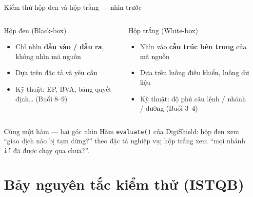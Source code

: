 \documentclass[aspectratio=169,12pt]{beamer}
\begin{document}
\begin{frame}{Kiểm thử hộp đen và hộp trắng --- nhìn trước}
  \begin{columns}
    \begin{block}{Hộp đen (Black-box)}
      \begin{itemize}
        \item Chỉ nhìn \textbf{đầu vào / đầu ra}, không nhìn mã nguồn
        \item Dựa trên đặc tả và yêu cầu
        \item Kỹ thuật: EP, BVA, bảng quyết định\ldots{} (Buổi 8--9)
      \end{itemize}
    \end{block}

    \begin{block}{Hộp trắng (White-box)}
      \begin{itemize}
        \item Nhìn vào \textbf{cấu trúc bên trong} của mã nguồn
        \item Dựa trên luồng điều khiển, luồng dữ liệu
        \item Kỹ thuật: độ phủ câu lệnh / nhánh / đường (Buổi 3--4)
      \end{itemize}
    \end{block}
  \end{columns}

  \vspace{0.5em}
  \begin{exampleblock}{Cùng một hàm --- hai góc nhìn \cite{ammann}}
    \small Hàm \texttt{evaluate()} của DigiShield: hộp đen xem
    ``giao dịch nào bị tạm dừng?'' theo đặc tả nghiệp vụ; hộp trắng xem
    ``mọi nhánh \texttt{if} đã được chạy qua chưa?''.
  \end{exampleblock}
\end{frame}

\section{Bảy nguyên tắc kiểm thử (ISTQB)}
\end{document}
